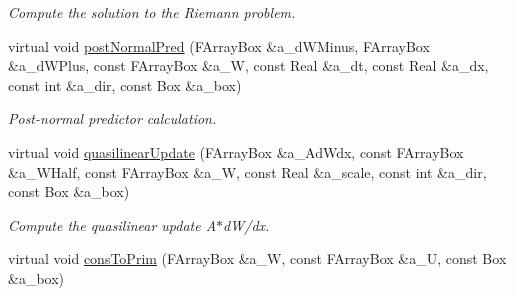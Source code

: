 \begin{DoxyCompactItemize}
\begin{DoxyCompactList}\small\item\em Compute the solution to the Riemann problem. \end{DoxyCompactList}\item 
virtual void \hyperlink{class_advection_physics_adcff7bb0c3cf117a51836754921ea75a}{post\-Normal\-Pred} (F\-Array\-Box \&a\-\_\-d\-W\-Minus, F\-Array\-Box \&a\-\_\-d\-W\-Plus, const F\-Array\-Box \&a\-\_\-\-W, const Real \&a\-\_\-dt, const Real \&a\-\_\-dx, const int \&a\-\_\-dir, const Box \&a\-\_\-box)
\begin{DoxyCompactList}\small\item\em Post-\/normal predictor calculation. \end{DoxyCompactList}\item 
\hypertarget{class_advection_physics_ac5eff7a0d16d0cece194ccae1959d33d}{virtual void \hyperlink{class_advection_physics_ac5eff7a0d16d0cece194ccae1959d33d}{quasilinear\-Update} (F\-Array\-Box \&a\-\_\-\-Ad\-Wdx, const F\-Array\-Box \&a\-\_\-\-W\-Half, const F\-Array\-Box \&a\-\_\-\-W, const Real \&a\-\_\-scale, const int \&a\-\_\-dir, const Box \&a\-\_\-box)}\label{class_advection_physics_ac5eff7a0d16d0cece194ccae1959d33d}

\begin{DoxyCompactList}\small\item\em Compute the quasilinear update A$\ast$d\-W/dx. \end{DoxyCompactList}\item 
\hypertarget{class_advection_physics_a54c4977c33114766868740fd21429d5f}{virtual void \hyperlink{class_advection_physics_a54c4977c33114766868740fd21429d5f}{cons\-To\-Prim} (F\-Array\-Box \&a\-\_\-\-W, const F\-Array\-Box \&a\-\_\-\-U, const Box \&a\-\_\-box)}\label{class_advection_physics_a54c4977c33114766868740fd21429d5f}


\end{DoxyCompactItemize}
